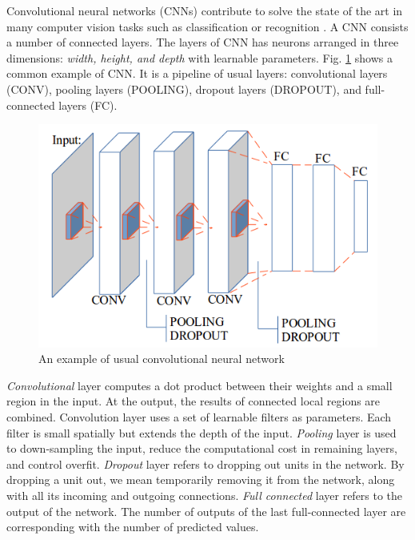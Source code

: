 \documentclass[conference]{IEEEtran}
\begin{document}
Convolutional neural networks (CNNs) contribute to solve the state of the art in many computer vision tasks such as classification \cite{krizhevsky2012imagenet}\cite{ciregan2012multi} or recognition \cite{li2015convolutional}\cite{tompson2014joint}. A CNN consists a number of connected layers. The layers of CNN has neurons arranged in three dimensions: \textit{width, height, and depth} with learnable parameters. Fig. \ref{figconvarc} shows a common example of CNN. It is a pipeline of usual layers: convolutional layers (CONV), pooling layers (POOLING), dropout layers (DROPOUT), and full-connected layers (FC).
\begin{figure}[htbp]
	\centerline{\includegraphics[scale=0.45]{images/convarc}}
	\caption{An example of usual convolutional neural network}
	\label{figconvarc}
\end{figure}

\textit{Convolutional} layer computes a dot product between their weights and a small region in the input. At the output, the results of connected local regions are combined. Convolution layer uses a set of learnable filters as parameters. Each filter is small spatially but extends the depth of the input. \textit{Pooling} layer is used to down-sampling the input, reduce the computational cost in remaining layers, and control overfit. \textit{Dropout} layer refers to dropping out units in the network. By dropping a unit out, we mean temporarily removing it from the network, along with all its incoming and outgoing connections. \textit{Full connected} layer refers to the output of the network. The number of outputs of the last full-connected layer are corresponding with the number of predicted values.
\end{document}
